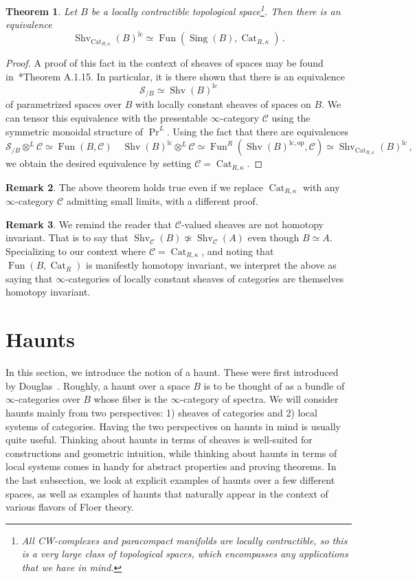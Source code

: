 \documentclass[10pt]{amsart}
\theoremstyle{plain}
\newtheorem{theorem}{Theorem}[subsection]
\theoremstyle{definition}
\newtheorem{rmk}[theorem]{Remark}
\DeclareMathOperator{\Shv}{Shv}
\DeclareMathOperator{\Sing}{Sing}
\DeclareMathOperator{\Fun}{Fun}
\DeclareMathOperator{\Cat}{Cat}
\newcommand{\oop}{\mathrm{op}}
\newcommand{\shvcat}{\Shv_{\mathrm{Cat}_{R, \kappa}}(B)}
\newcommand{\cC}{\mathcal{C}}
\newcommand{\cS}{\mathcal{S}}
\begin{document}
\begin{theorem} \label{thm:sheaves_vs_local_systems}
Let $B$ be a locally contractible topological space\footnote{All CW-complexes and paracompact manifolds are locally contractible, so this is a very large class of topological spaces, which encompasses any applications that we have in mind.}.
Then there is an equivalence
$$
\shvcat^{\mathrm{lc}} \simeq \Fun(\Sing(B), \Cat_{R, \kappa}) \,.
$$
\end{theorem}

\begin{proof}
A proof of this fact in the context of sheaves of spaces may be found in~\cite{HA}*{Theorem A.1.15}.
In particular, it is there shown that there is an equivalence
$$
\cS_{/B} \simeq \Shv(B)^{\mathrm{lc}}
$$
of parametrized spaces over $B$ with locally constant sheaves of spaces on $B$.
We can tensor this equivalence with the presentable $\infty$-category $\cC$ using the symmetric monoidal structure of $\Pr^{L}$.
Using the fact that there are equivalences
$$
\cS_{/B} \otimes^L \cC\simeq \Fun(B, \cC) \quad \Shv(B)^{\mathrm{lc}} \otimes^{L} \cC \simeq \Fun^{R}(\Shv(B)^{\mathrm{lc},\oop}, \cC)\simeq \Shv_{\mathrm{Cat}_{R, \kappa}}(B)^{\mathrm{lc}} \,,
$$
we obtain the desired equivalence by setting $\cC = \Cat_{R, \kappa}$.
\end{proof}

\begin{rmk}
The above theorem holds true even if we replace  $\Cat_{R, \kappa}$ with any $\infty$-category $\cC$ admitting small limits, with a different proof.
\end{rmk}

\begin{rmk}
We remind the reader that $\cC$-valued sheaves are not homotopy invariant.
That is to say that $\Shv_{\cC}(B) \nsimeq  \Shv_{\cC}(A)$ even though $B \simeq A$.
Specializing to our context where $\cC = \Cat_{R, \kappa}$, and noting that $\Fun(B, \Cat_R)$ is manifestly homotopy invariant, we interpret the above as saying that $\infty$-categories of locally constant sheaves of categories are themselves homotopy invariant.
\end{rmk}

\section{Haunts}

In this section, we introduce the notion of a  haunt.
These were first introduced by Douglas~\cite{Dou05}.
Roughly, a haunt over a space $B$ is to be thought of as a bundle of $\infty$-categories over $B$ whose fiber is the $\infty$-category of spectra.
We will consider haunts mainly from two perspectives: 1) sheaves of categories and 2) local systems of categories.
Having the two perspectives on haunts in mind is usually quite useful.
Thinking about haunts in terms of sheaves is well-suited for constructions and geometric intuition, while thinking about haunts in terms of local systems comes in handy for abstract properties and proving theorems.
In the last subsection, we look at explicit examples of haunts over a few different spaces, as well as examples of haunts that naturally appear in the context of various flavors of Floer theory.
\end{document}
